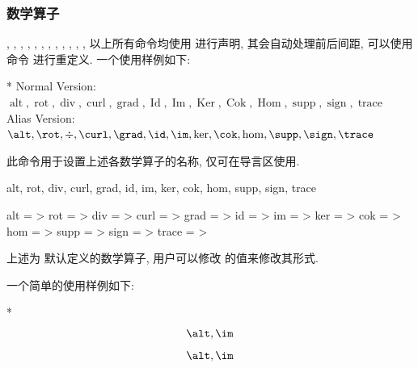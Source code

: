 \clearpage
\subsubsection{数学算子}
\begin{function}[updated=2025-04-24]{\alt, \rot, \div, \curl, \grad, \id, \im, \ker, \cok, \hom, \supp, \sign, \trace}
  以上所有命令均使用  进行声明, 其会自动处理前后间距, 可以使用命令  进行重定义.
  一个使用样例如下:
\end{function}
\begin{DocExample}*
Normal Version: $\operatorname{alt}, \operatorname{rot}, \operatorname{div}, \operatorname{curl}, \operatorname{grad}, \operatorname{Id}, \operatorname{Im}, \operatorname{Ker}, \operatorname{Cok}, \operatorname{Hom}, \operatorname{supp}, \operatorname{sign}, \operatorname{trace}$ \\
Alias Version: $\alt, \rot, \div, \curl, \grad, \id, \im, \ker, \cok, \hom, \supp, \sign, \trace$
\end{DocExample}


\begin{function}[updated=2025-04-25]{\zaliasopset}
  \begin{syntax}
  \end{syntax}
  此命令用于设置上述各数学算子的名称, 仅可在导言区使用.
\end{function}


\begin{keyval}[parent=..]{alt, rot, div, curl, grad, id, im, ker, cok, hom, supp, sign, trace}
  \begin{syntax}
    alt   = >
    rot   = >
    div   = >
    curl  = >
    grad  = >
    id    = >
    im    = >
    ker   = >
    cok   = >
    hom   = >
    supp  = >
    sign  = >
    trace = >
  \end{syntax}
  上述为 \ztex{} 默认定义的数学算子, 用户可以修改  的值来修改其形式.
\end{keyval}
一个简单的使用样例如下\zchcmd:
\begin{DocExample}*
  \[ \alt, \im \]
  \[ \alt, \im \]
\end{DocExample}



